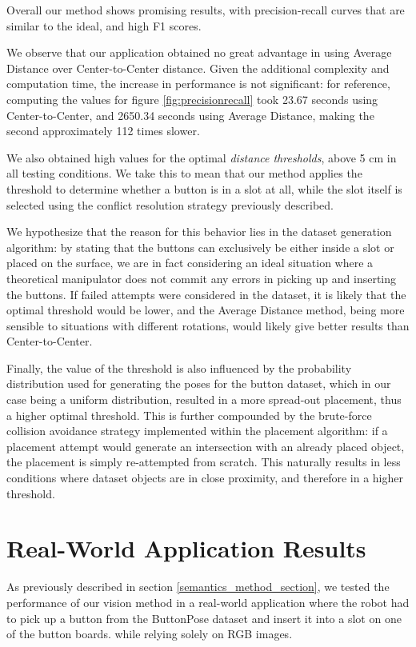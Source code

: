 Overall our method shows promising results, with precision-recall curves that are similar to the ideal, and high F1 scores.

We observe that our application obtained no great advantage in using Average Distance over Center-to-Center distance. Given the additional complexity and computation time, the increase in performance is not significant: for reference, computing the values for figure \ref{fig:precisionrecall} took 23.67 seconds using Center-to-Center, and 2650.34 seconds using Average Distance, making the second approximately 112 times slower.

We also obtained high values for the optimal \emph{distance thresholds}, above 5 cm in all testing conditions. We take this to mean that our method applies the threshold to determine whether a button is in a slot at all, while the slot itself is selected using the conflict resolution strategy previously described.

We hypothesize that the reason for this behavior lies in the dataset generation algorithm: by stating that the buttons can exclusively be either inside a slot or placed on the surface, we are in fact considering an ideal situation where a theoretical manipulator does not commit any errors in picking up and inserting the buttons. If failed attempts were considered in the dataset, it is likely that the optimal threshold would be lower, and the Average Distance method, being more sensible to situations with different rotations, would likely give better results than Center-to-Center.

Finally, the value of the threshold is also influenced by the probability distribution used for generating the poses for the button dataset, which in our case being a uniform distribution, resulted in a more spread-out placement, thus a higher optimal threshold. This is further compounded by the brute-force collision avoidance strategy implemented within the placement algorithm: if a placement attempt would generate an intersection with an already placed object, the placement is simply re-attempted from scratch. This naturally results in less conditions where dataset objects are in close proximity, and therefore in a higher threshold.

\section{Real-World Application Results}

As previously described in section \ref{semantics_method_section}, we tested the performance of our vision method in a real-world application where the robot had to pick up a button from the ButtonPose dataset and insert it into a slot on one of the button boards. while relying solely on RGB images.

